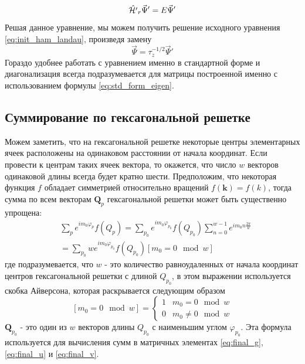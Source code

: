 \documentclass[a4paper,article,14pt]{extarticle}
\begin{document}
$$
\hat {\cal H'}_{r} \vec{\Psi}' = E \vec{\Psi}'
$$
Решая данное уравнение, мы можем получить решение исходного уравнения \eqref{eq:init_ham_landau}, произведя замену
$$
\vec{\Psi} = \tau_z^{-1/2} \vec{\Psi}'
$$
Гораздо удобнее работать с уравнением именно в стандартной форме и диагонализация всегда подразумевается для матрицы построенной именно с использованием формулы \eqref{eq:std_form_eigen}.


\subsection{Суммирование по гексагональной решетке}

Можем заметить, что на гексагональной решетке некоторые центры элементарных ячеек расположены на одинаковом расстоянии от начала координат. Если провести к центрам таких ячеек вектора, то окажется, что число $w$ векторов одинаковой длины всегда будет кратно шести. Предположим, что некоторая функция $f$ обладает симметрией относительно вращений $f(\mathbf{k})=f(k)$, тогда сумма по всем векторам $\mathbf{Q}_p$ гексагональной решетки может быть существенно упрощена:
\begin{equation}
\label{eq:sum_qp}
\begin{aligned}
&\sum\limits_{p} e^{i m_0\varphi_p}   f(Q_p)  = \sum\limits_{p_0} e^{im_0\varphi_{{p_0}}} f(Q_{p_0})   \sum\limits_{n=0}^{w-1} e^{i m_0 n \frac{2 \pi}{w}} \\
  &=\sum\limits_{p_0} w e^{i m_0\varphi_{p_0}} f(Q_{p_0}) \left[m_0 = 0 \mod w  \right] 
\end{aligned}
\end{equation}
где подразумевается, что $w$ - это количество равноудаленных от начала координат центров гексагональной решетки с длиной $Q_{p_0}$, в этом выражении используется скобка Айверсона, которая раскрывается следующим образом
$$
\left[m_0 = 0 \mod w  \right] =   
\begin{cases}
   1 & m_0 = 0 \mod w \\
   0 & m_0 \neq 0 \mod w 
 \end{cases}
$$
$\mathbf{Q}_{p_0}$ - это один из $w$ векторов длины $Q_{p_0}$ с наименьшим углом $\varphi_{p_0}$.
Эта формула используется для вычисления сумм в матричных элементах \eqref{eq:final_g}, \eqref{eq:final_u} и \eqref{eq:final_v}.
\end{document}

